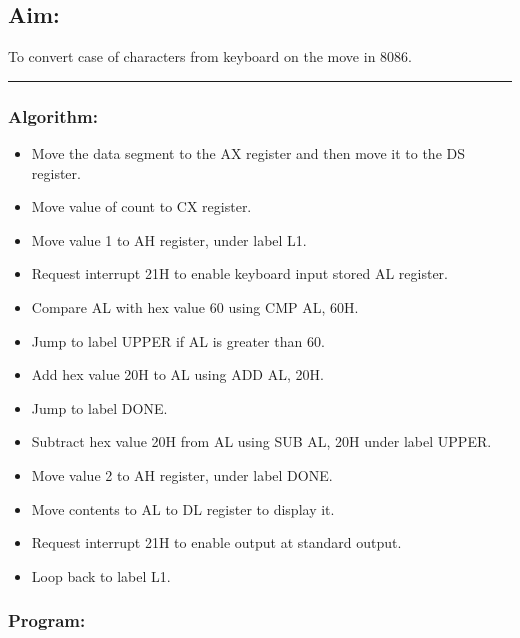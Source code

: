 \documentclass[10pt,a4paper]{article}
\begin{document}
\begin{flushleft}
\subsection*{\textbf{Aim:}} 
To convert case of characters from keyboard on the move in 8086.

\vspace{1cm}
\hrule

\subsubsection*{\textbf{Algorithm:}}
\begin{itemize}
    \item Move the data segment to the AX register and then move it to the DS register.
    \item Move value of count to CX register.
    \item Move value 1 to AH register, under label L1.
    \item Request interrupt 21H to enable keyboard input stored AL register. 
    \item Compare AL with hex value 60 using CMP AL, 60H. 
    \item Jump to label UPPER if AL is greater than 60.
    \item Add hex value 20H to AL using ADD AL, 20H.
    \item Jump to label DONE.
    \item Subtract hex value 20H from AL using SUB AL, 20H under label UPPER.
    \item Move value 2 to AH register, under label DONE.
    \item Move contents to AL to DL register to display it.
    \item Request interrupt 21H to enable output at standard output.
    \item Loop back to label L1.
\end{itemize}

\newpage
\subsubsection*{\textbf{Program:}}


\end{flushleft}
\end{document}
